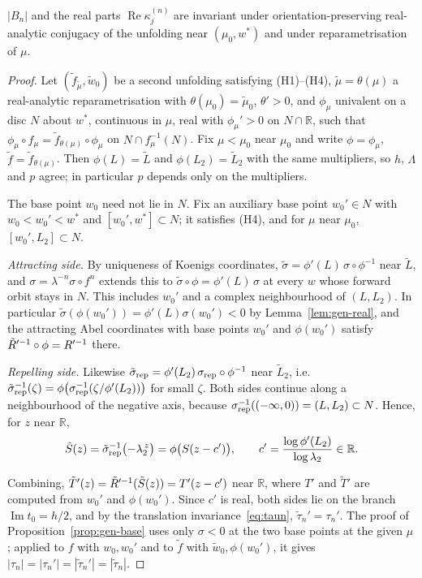 \begin{corollary}\label{cor:gen-invariant}
$|B_n|$ and the real parts $\operatorname{Re}\kappa^{(n)}_j$ are invariant under
orientation-preserving real-analytic conjugacy of the unfolding near
$(\mu_0,w^*)$ and under reparametrisation of $\mu$.
\end{corollary}

\begin{proof}
Let $(\tilde f_{\tilde\mu},\tilde w_0)$ be a second unfolding satisfying
\textup{(H1)--(H4)}, $\tilde\mu=\theta(\mu)$ a real-analytic reparametrisation
with $\theta(\mu_0)=\tilde\mu_0$, $\theta'>0$, and $\phi_\mu$ univalent on a disc
$N$ about $w^*$, continuous in $\mu$, real with $\phi_\mu'>0$ on $N\cap\mathbb R$,
such that $\phi_\mu\circ f_\mu=\tilde f_{\theta(\mu)}\circ\phi_\mu$ on
$N\cap f_\mu^{-1}(N)$.  Fix $\mu<\mu_0$ near $\mu_0$ and write $\phi=\phi_\mu$,
$\tilde f=\tilde f_{\theta(\mu)}$.  Then $\phi(L)=\tilde L$ and
$\phi(L_2)=\tilde L_2$ with the same multipliers, so $h$, $\Lambda$ and $p$
agree; in particular $p$ depends only on the multipliers.

The base point $w_0$ need not lie in $N$.  Fix an auxiliary base point
$w_0'\in N$ with $w_0<w_0'<w^*$ and $[w_0',w^*]\subset N$; it satisfies
\textup{(H4)}, and for $\mu$ near $\mu_0$, $[w_0',L_2]\subset N$.

\emph{Attracting side.}  By uniqueness of Koenigs coordinates,
$\tilde\sigma=\phi'(L)\,\sigma\circ\phi^{-1}$ near $\tilde L$, and
$\sigma=\lambda^{-n}\sigma\circ f^n$ extends this to
$\tilde\sigma\circ\phi=\phi'(L)\,\sigma$ at every $w$ whose forward orbit stays
in $N$.  This includes $w_0'$ and a complex neighbourhood of $(L,L_2)$.  In
particular $\tilde\sigma(\phi(w_0'))=\phi'(L)\sigma(w_0')<0$ by
Lemma~\ref{lem:gen-real}, and the attracting Abel coordinates with base points
$w_0'$ and $\phi(w_0')$ satisfy $\tilde{R}'^{-1}\circ\phi=R'^{-1}$ there.

\emph{Repelling side.}  Likewise
$\tilde\sigma_{\rm rep}=\phi'(L_2)\,\sigma_{\rm rep}\circ\phi^{-1}$ near $\tilde L_2$, i.e.\
$\tilde\sigma_{\rm rep}^{-1}(\zeta)=\phi\bigl(\sigma_{\rm rep}^{-1}(\zeta/\phi'(L_2))\bigr)$
for small $\zeta$.  Both sides continue along a neighbourhood of the negative
axis, because $\sigma_{\rm rep}^{-1}((-\infty,0))=(L,L_2)\subset N$.  Hence, for $z$
near $\mathbb R$,
\[
 \tilde S(z)=\tilde\sigma_{\rm rep}^{-1}\bigl(-\lambda_2^{\,z}\bigr)
 =\phi\bigl(S(z-c')\bigr),\qquad c'=\frac{\log\phi'(L_2)}{\log\lambda_2}\in\mathbb R .
\]

Combining, $\tilde T'(z)=\tilde{R}'^{-1}(\tilde S(z))=T'(z-c')$ near $\mathbb R$,
where $T'$ and $\tilde T'$ are computed from $w_0'$ and $\phi(w_0')$.  Since
$c'$ is real, both sides lie on the branch $\operatorname{Im}t_0=h/2$, and by
the translation invariance~\eqref{eq:taun}, $\tilde\tau_n'=\tau_n'$.  The proof of
Proposition~\ref{prop:gen-base} uses only $\sigma<0$ at the two base points at
the given $\mu$; applied to $f$ with $w_0,w_0'$ and to $\tilde f$ with
$\tilde w_0,\phi(w_0')$, it gives
$|\tau_n|=|\tau_n'|=|\tilde\tau_n'|=|\tilde\tau_n|$.


\end{proof}
